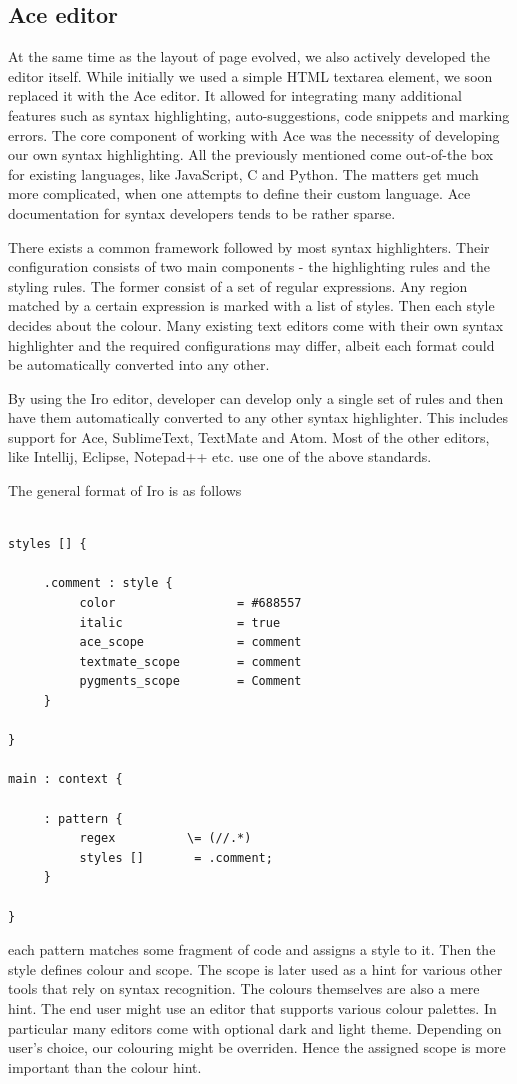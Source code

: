 \subsection{Ace editor}

At the same time as the layout of page evolved, we also actively developed the editor itself. While initially we used a simple HTML textarea element, we soon replaced it with the Ace editor. It allowed for integrating many additional features such as syntax highlighting, auto-suggestions, code snippets and marking errors. The core component of working with Ace was the necessity of developing our own syntax highlighting. All the previously mentioned come out-of-the box for existing languages, like JavaScript, C and Python. The matters get much more complicated, when one attempts to define their custom language. Ace documentation for syntax developers tends to be rather sparse. 

There exists a common framework followed by most syntax highlighters. Their configuration consists of two main components - the highlighting rules and the styling rules. The former consist of a set of regular expressions. Any region matched by a certain expression is marked with a list of styles. Then each style decides about the colour. Many existing text editors come with their own syntax highlighter and the required configurations may differ, albeit each format could be automatically converted into any other. 

By using the Iro editor, developer can develop only a single set of rules and then have them automatically converted to any other syntax highlighter. This includes support for Ace, SublimeText, TextMate and Atom. Most of the other editors, like Intellij, Eclipse, Notepad++ etc. use one of the above standards. 

The general format of Iro is as follows
\begin{lstlisting}

styles [] {
     
     .comment : style {
          color                 = #688557
          italic                = true
          ace_scope             = comment
          textmate_scope        = comment
          pygments_scope        = Comment
     }
 
}

main : context {
     
     : pattern {
          regex          \= (//.*)
          styles []       = .comment;
     }
 
}
\end{lstlisting}
each pattern matches some fragment of code and assigns a style to it. Then the style defines colour and scope. The scope is later used as a hint for various other tools that rely on syntax recognition. The colours themselves are also a mere hint. The end user might use an editor that supports various colour palettes. In particular many editors come with optional dark and light theme. Depending on user's choice, our colouring might be overriden. Hence the assigned scope is more important than the colour hint.

